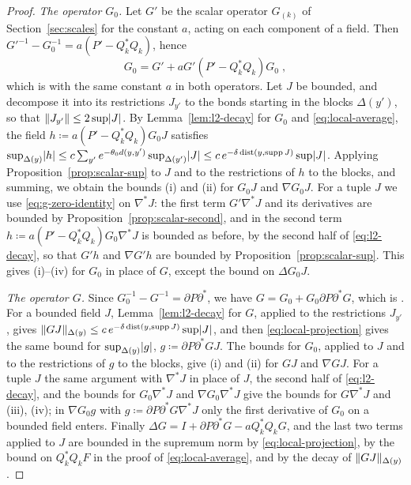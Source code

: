 \documentclass[11pt]{preprint}
\DeclarePairedDelimiter{\abs}{\lvert}{\rvert}
\DeclarePairedDelimiter{\norm}{\lVert}{\rVert}
\numberwithin{equation}{section}
\theoremstyle{definition}
\theoremstyle{remark}
\theoremstyle{plain}
\begin{document}
\begin{proof}
\emph{The operator $G_0$.} Let $G'$ be the scalar operator $G_{(k)}$ of Section~\ref{sec:scales} for the constant $a$, acting on each component of a field. Then $G'^{-1} - G_0^{-1} = a(P' - Q_k^*Q_k)$, hence
\begin{equation}\label{eq:g-zero-identity}
    G_0 = G' + aG'(P' - Q_k^*Q_k)G_0\;,
\end{equation}
which is \cite[(1.133)]{BalabanPRT1} with the same constant $a$ in both operators. Let $J$ be bounded, and decompose it into its restrictions $J_{y'}$ to the bonds starting in the blocks $\Delta(y')$, so that $\norm{J_{y'}} \leq 2\sup\abs J$. By Lemma~\ref{lem:l2-decay} for $G_0$ and \eqref{eq:local-average}, the field $h \coloneqq a(P' - Q_k^*Q_k)G_0J$ satisfies $\sup_{\Delta(y)}\abs h \leq c\sum_{y'}e^{-\theta_0d(y, y')}\sup_{\Delta(y')}\abs J \leq c\,e^{-\delta\operatorname{dist}(y, \operatorname{supp}J)}\sup\abs J$. Applying Proposition~\ref{prop:scalar-sup} to $J$ and to the restrictions of $h$ to the blocks, and summing, we obtain the bounds (i) and (ii) for $G_0J$ and $\nabla G_0J$. For a tuple $J$ we use \eqref{eq:g-zero-identity} on $\nabla^*J$: the first term $G'\nabla^*J$ and its derivatives are bounded by Proposition~\ref{prop:scalar-second}, and in the second term $h \coloneqq a(P' - Q_k^*Q_k)G_0\nabla^*J$ is bounded as before, by the second half of \eqref{eq:l2-decay}, so that $G'h$ and $\nabla G'h$ are bounded by Proposition~\ref{prop:scalar-sup}. This gives (i)--(iv) for $G_0$ in place of $G$, except the bound on $\Delta G_0J$.

\emph{The operator $G$.} Since $G_0^{-1} - G^{-1} = \partial P\partial^*$, we have $G = G_0 + G_0\partial P\partial^*G$, which is \cite[(1.132)]{BalabanPRT1}. For a bounded field $J$, Lemma~\ref{lem:l2-decay} for $G$, applied to the restrictions $J_{y'}$, gives $\norm{GJ}_{\Delta(y)} \leq c\,e^{-\delta\operatorname{dist}(y, \operatorname{supp}J)}\sup\abs J$, and then \eqref{eq:local-projection} gives the same bound for $\sup_{\Delta(y)}\abs{g}$, $g \coloneqq \partial P\partial^*GJ$. The bounds for $G_0$, applied to $J$ and to the restrictions of $g$ to the blocks, give (i) and (ii) for $GJ$ and $\nabla GJ$. For a tuple $J$ the same argument with $\nabla^*J$ in place of $J$, the second half of \eqref{eq:l2-decay}, and the bounds for $G_0\nabla^*J$ and $\nabla G_0\nabla^*J$ give the bounds for $G\nabla^*J$ and (iii), (iv); in $\nabla G_0g$ with $g \coloneqq \partial P\partial^*G\nabla^*J$ only the first derivative of $G_0$ on a bounded field enters. Finally $\Delta G = I + \partial P\partial^*G - aQ_k^*Q_kG$, and the last two terms applied to $J$ are bounded in the supremum norm by \eqref{eq:local-projection}, by the bound on $Q_k^*Q_kF$ in the proof of \eqref{eq:local-average}, and by the decay of $\norm{GJ}_{\Delta(y)}$.
\end{proof}
\end{document}

